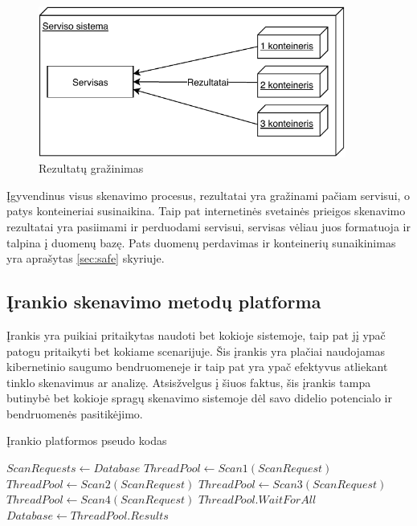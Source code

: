\documentclass[a4paper,12pt,fleqn]{article}
\begin{document}
\begin{figure}[H]
	\centering
	\includegraphics[width=0.9\textwidth]{figs/3Containerlt.pdf}
	\caption{Rezultatų gražinimas}
	\label{fig:3Container}
\end{figure}

Įgyvendinus visus skenavimo procesus, rezultatai yra gražinami pačiam servisui, o patys konteineriai susinaikina. Taip pat internetinės svetainės prieigos skenavimo rezultatai yra pasiimami ir perduodami servisui, servisas vėliau juos formatuoja ir talpina į duomenų bazę. Pats duomenų perdavimas ir konteinerių sunaikinimas yra aprašytas \ref{sec:safe} skyriuje.


\subsection{Įrankio skenavimo metodų platforma}

Įrankis yra puikiai pritaikytas naudoti bet kokioje sistemoje, taip pat jį ypač patogu pritaikyti bet kokiame scenarijuje. Šis įrankis yra plačiai naudojamas kibernetinio saugumo bendruomeneje ir taip pat yra ypač efektyvus atliekant tinklo skenavimus ar analizę. Atsisžvelgus į šiuos faktus, šis įrankis tampa butinybė bet kokioje spragų skenavimo sistemoje dėl savo didelio potencialo ir bendruomenės pasitikėjimo.
\begin{algorithm}
	\caption{Įrankio platformos pseudo kodas}
	\label{alg:pseudo}
	\begin{algorithmic}
		\STATE $ScanRequests \gets Database$
		\STATE $ThreadPool \gets Scan1(ScanRequest)$
		\STATE $ThreadPool \gets Scan2(ScanRequest)$
		\STATE $ThreadPool \gets Scan3(ScanRequest)$
		\STATE $ThreadPool \gets Scan4(ScanRequest)$
		\STATE $ThreadPool. Wait For All$
		\STATE $Database \gets ThreadPool.Results$
		\ENDFOR
		\ENDIF
	\end{algorithmic}
\end{algorithm}
\end{document}
